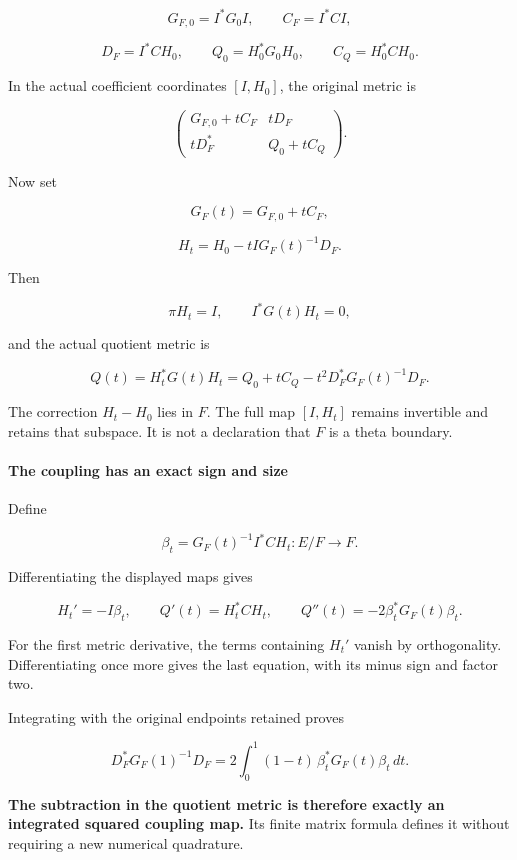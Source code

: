 \[
G_{F,0}=I^*G_0I,\qquad C_F=I^*CI,
\]

\[
D_F=I^*CH_0,\qquad
Q_0=H_0^*G_0H_0,\qquad C_Q=H_0^*CH_0.
\]

In the actual coefficient coordinates \([I,H_0]\), the original metric is

\[
\boxed{
\begin{pmatrix}
G_{F,0}+tC_F&tD_F\\
tD_F^*&Q_0+tC_Q
\end{pmatrix}.
}
\]

Now set

\[
G_F(t)=G_{F,0}+tC_F,
\]

\[
\boxed{
H_t=H_0-tI G_F(t)^{-1}D_F.
}
\]

Then

\[
\pi H_t=I,\qquad I^*G(t)H_t=0,
\]

and the actual quotient metric is

\[
\boxed{
Q(t)=H_t^*G(t)H_t
=
Q_0+tC_Q-t^2D_F^*G_F(t)^{-1}D_F.
}
\]

The correction \(H_t-H_0\) lies in \(F\). The full map \([I,H_t]\) remains invertible and retains that subspace. It is not a declaration that \(F\) is a theta boundary.

\paragraph{The coupling has an exact sign and size}\label{endpoint-exponential_constituent_original--the-coupling-has-an-exact-sign-and-size}

Define

\[
\boxed{
\beta_t=G_F(t)^{-1}I^*CH_t:E/F\to F.
}
\]

Differentiating the displayed maps gives

\[
\boxed{
H_t'=-I\beta_t,\qquad
Q'(t)=H_t^*CH_t,\qquad
Q''(t)=-2\beta_t^*G_F(t)\beta_t.
}
\]

For the first metric derivative, the terms containing \(H_t'\) vanish by orthogonality. Differentiating once more gives the last equation, with its minus sign and factor two.

Integrating with the original endpoints retained proves

\[
\boxed{
D_F^*G_F(1)^{-1}D_F
=
2\int_0^1(1-t)\,
\beta_t^*G_F(t)\beta_t\,dt.
}
\]

\textbf{The subtraction in the quotient metric is therefore exactly an integrated squared coupling map.} Its finite matrix formula defines it without requiring a new numerical quadrature.

